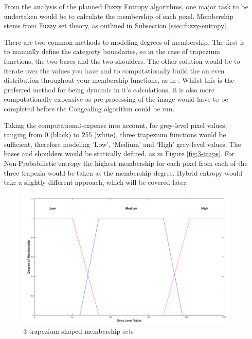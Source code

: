 From the analysis of the planned Fuzzy Entropy algorithms, one major task to be undertaken would be to calculate the membership of each pixel. Membership stems from Fuzzy set theory, as outlined in Subsection \ref{ssec:fuzzy-entropy}.

There are two common methods to modeling degrees of membership. The first is to manually define the categorty boundaries, so in the case of trapezium functions, the two bases and the two shoulders. The other solution would be to iterate over the values you have and to computationally build the an even distribution throughout your membership functions, as in \cite{Mac_Parthalain_Strange_2013}. Whilst this is the preferred method for being dynamic in it's calculations, it is also more computationally expensive as pre-processing of the image would have to be completed before the \Gls{Congealing} algorithm could be run.

Taking the computational-expense into account, for grey-level pixel values, ranging from 0 (black) to 255 (white), three trapezium functions would be sufficient, therefore modeling `Low', `Medium' and `High' grey-level values. The bases and shoulders would be statically defined, as in Figure \ref{fig:3-traps}. For Non-Probabilistic entropy the highest membership for each pixel from each of the three trapezia would be taken as the membership degree. Hybrid entropy would take a slightly different approach, which will be covered later.

\begin{figure}[H]
  \center
  \includegraphics[scale=0.4]{Chapter2/hybrid-img/3_traps.png}
  \caption{3 trapezium-shaped membership sets}
  \label{fig:3-trapeziums}
\end{figure}

